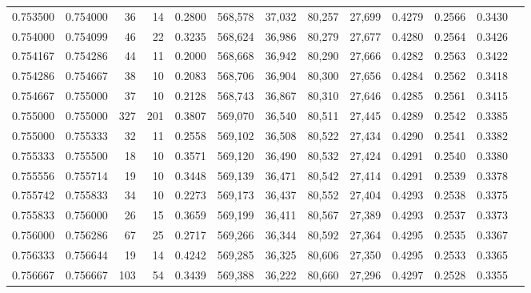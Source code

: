 \begin{tabular}{rrrrrrrrrrrrr}
0.753500 & 0.754000 &    36 &  14 &                                     0.2800 & 568,578 &  37,032 &  80,257 &  27,699 & 0.4279 & 0.2566 & 0.3430 \\
0.754000 & 0.754099 &    46 &  22 &                                     0.3235 & 568,624 &  36,986 &  80,279 &  27,677 & 0.4280 & 0.2564 & 0.3426 \\
0.754167 & 0.754286 &    44 &  11 &                                     0.2000 & 568,668 &  36,942 &  80,290 &  27,666 & 0.4282 & 0.2563 & 0.3422 \\
0.754286 & 0.754667 &    38 &  10 &                                     0.2083 & 568,706 &  36,904 &  80,300 &  27,656 & 0.4284 & 0.2562 & 0.3418 \\
0.754667 & 0.755000 &    37 &  10 &                                     0.2128 & 568,743 &  36,867 &  80,310 &  27,646 & 0.4285 & 0.2561 & 0.3415 \\
0.755000 & 0.755000 &   327 & 201 &                                     0.3807 & 569,070 &  36,540 &  80,511 &  27,445 & 0.4289 & 0.2542 & 0.3385 \\
0.755000 & 0.755333 &    32 &  11 &                                     0.2558 & 569,102 &  36,508 &  80,522 &  27,434 & 0.4290 & 0.2541 & 0.3382 \\
0.755333 & 0.755500 &    18 &  10 &                                     0.3571 & 569,120 &  36,490 &  80,532 &  27,424 & 0.4291 & 0.2540 & 0.3380 \\
0.755556 & 0.755714 &    19 &  10 &                                     0.3448 & 569,139 &  36,471 &  80,542 &  27,414 & 0.4291 & 0.2539 & 0.3378 \\
0.755742 & 0.755833 &    34 &  10 &                                     0.2273 & 569,173 &  36,437 &  80,552 &  27,404 & 0.4293 & 0.2538 & 0.3375 \\
0.755833 & 0.756000 &    26 &  15 &                                     0.3659 & 569,199 &  36,411 &  80,567 &  27,389 & 0.4293 & 0.2537 & 0.3373 \\
0.756000 & 0.756286 &    67 &  25 &                                     0.2717 & 569,266 &  36,344 &  80,592 &  27,364 & 0.4295 & 0.2535 & 0.3367 \\
0.756333 & 0.756644 &    19 &  14 &                                     0.4242 & 569,285 &  36,325 &  80,606 &  27,350 & 0.4295 & 0.2533 & 0.3365 \\
0.756667 & 0.756667 &   103 &  54 &                                     0.3439 & 569,388 &  36,222 &  80,660 &  27,296 & 0.4297 & 0.2528 & 0.3355 \\

\end{tabular}
